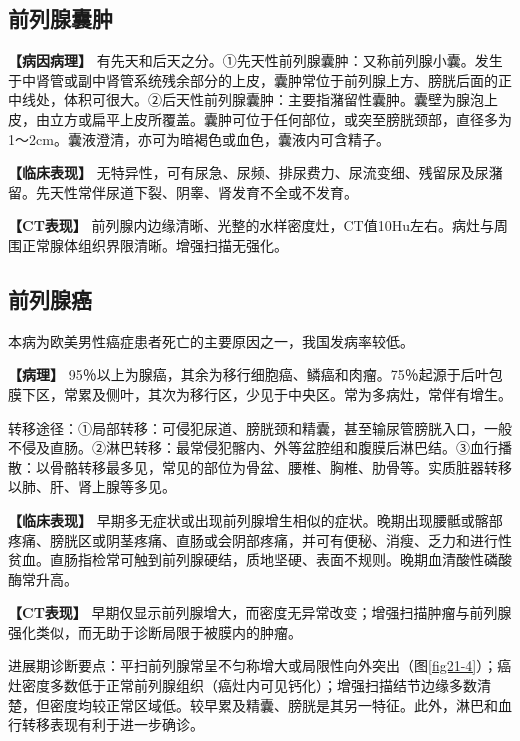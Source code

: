 \subsection{前列腺囊肿}

\textbf{【病因病理】}
有先天和后天之分。①先天性前列腺囊肿：又称前列腺小囊。发生于中肾管或副中肾管系统残余部分的上皮，囊肿常位于前列腺上方、膀胱后面的正中线处，体积可很大。②后天性前列腺囊肿：主要指潴留性囊肿。囊壁为腺泡上皮，由立方或扁平上皮所覆盖。囊肿可位于任何部位，或突至膀胱颈部，直径多为1～2cm。囊液澄清，亦可为暗褐色或血色，囊液内可含精子。

\textbf{【临床表现】}
无特异性，可有尿急、尿频、排尿费力、尿流变细、残留尿及尿潴留。先天性常伴尿道下裂、阴睾、肾发育不全或不发育。

\textbf{【CT表现】}
前列腺内边缘清晰、光整的水样密度灶，CT值10Hu左右。病灶与周围正常腺体组织界限清晰。增强扫描无强化。

\subsection{前列腺癌}

本病为欧美男性癌症患者死亡的主要原因之一，我国发病率较低。

\textbf{【病理】}
95％以上为腺癌，其余为移行细胞癌、鳞癌和肉瘤。75％起源于后叶包膜下区，常累及侧叶，其次为移行区，少见于中央区。常为多病灶，常伴有增生。

转移途径：①局部转移：可侵犯尿道、膀胱颈和精囊，甚至输尿管膀胱入口，一般不侵及直肠。②淋巴转移：最常侵犯髂内、外等盆腔组和腹膜后淋巴结。③血行播散：以骨骼转移最多见，常见的部位为骨盆、腰椎、胸椎、肋骨等。实质脏器转移以肺、肝、肾上腺等多见。

\textbf{【临床表现】}
早期多无症状或出现前列腺增生相似的症状。晚期出现腰骶或髂部疼痛、膀胱区或阴茎疼痛、直肠或会阴部疼痛，并可有便秘、消瘦、乏力和进行性贫血。直肠指检常可触到前列腺硬结，质地坚硬、表面不规则。晚期血清酸性磷酸酶常升高。

\textbf{【CT表现】}
早期仅显示前列腺增大，而密度无异常改变；增强扫描肿瘤与前列腺强化类似，而无助于诊断局限于被膜内的肿瘤。

进展期诊断要点：平扫前列腺常呈不匀称增大或局限性向外突出（图\ref{fig21-4}）；癌灶密度多数低于正常前列腺组织（癌灶内可见钙化）；增强扫描结节边缘多数清楚，但密度均较正常区域低。较早累及精囊、膀胱是其另一特征。此外，淋巴和血行转移表现有利于进一步确诊。

